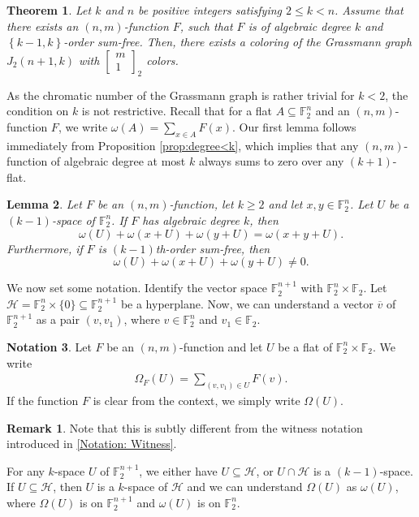 \documentclass[12pt]{article}
\newtheorem{thm}{Theorem}[section]
\newtheorem{lem}[thm]{Lemma}
\theoremstyle{definition}
\newtheorem{notation}[thm]{Notation}
\newtheorem*{remark}{Remark}
\newcommand{\HH}{\mathcal{H}}
\newcommand{\Gauss}[2]{{\begin{bmatrix} #1 \\ #2 \end{bmatrix}_2}}
\newcommand{\F}{\mathbb F}
\newcommand{\Fpnv}{\mathbb{F}_2^n}
\newcommand{\set}[1]{\left\{#1\right\}}
\newcounter{numb}
\begin{document}
\begin{thm} \label{T: k and k-1-order sum-free gives coloring}
    Let $k$ and $n$ be positive integers satisfying $2\leq k < n$. Assume that there exists an $(n,m)$-function $F$, such that $F$ is 
 of algebraic degree $k$
and $\set{k-1,k}$-order sum-free.
    Then, there exists a coloring of the Grassmann graph $J_2(n+1,k)$ with $\Gauss{m}{1}$ colors.
\end{thm}

As the chromatic number of the Grassmann graph is rather trivial for $k<2$, the condition on $k$ is not restrictive.
Recall that  for a flat $A\subseteq\Fpnv$ and an $(n,m)$-function $F$, we write $ \omega(A)=\sum_{x\in A} F(x)$. Our first lemma follows immediately from Proposition \ref{prop:degree<k}, which implies that any $(n, m)$-function of algebraic degree at most $k$ always sums to zero over any $(k+1)$-flat.

\begin{lem} \label{L: special condition} 
    Let $F$ be an $(n,m)$-function, let $k\geq 2$ and let $x, y \in \F_{2}^n$. Let $U$ be a $(k-1)$-space of $\F_2^n$. If $F$ has algebraic degree $k$, then $$\omega(U)+\omega(x+U)+\omega(y+U)=\omega(x+y+U).$$
    Furthermore, if $F$ is $(k-1)$th-order sum-free, then 
    $$
    \omega(U)+\omega(x+U)+\omega(y+U) \neq 0.
    $$
\end{lem}

We now set some notation. Identify the vector space $\F_2^{n+1}$ with $\F_2^n\times \F_2$. Let $\mathcal{H} = \F_2^n \times \{ 0\} \subseteq \F_2^{n+1}$ be a hyperplane. Now, we can understand a vector $\overline{v}$ of $\F_2^{n+1}$ as a pair $(v,v_1)$, where $v\in \F_2^n$ and $v_1\in \F_2$.



\begin{notation}
    Let $F$ be an $(n,m)$-function and let $U$ be a flat of $\F_2^n\times \F_2$. We write 
    \begin{align*}
        \Omega_F(U)=\sum\limits_{(v,v_1)\in U}^{}   F(v).
    \end{align*}
    If the function $F$ is clear from the context, we simply write $\Omega(U)$.
\end{notation}

\begin{remark}
    Note that this is subtly different from the witness notation introduced in \ref{Notation: Witness}.
\end{remark}


For any $k$-space $U$ of $\F_2^{n+1}$, we either have $U\subseteq \HH$, or $U\cap \HH$ is a $(k-1)$-space. 
If $U\subseteq \HH$, then $U$ is a $k$-space of $\HH$ and we can understand $\Omega(U)$ as $\omega(U)$, where $\Omega(U)$ is on $\F_2^{n+1}$ and $\omega(U)$ is on $\F_2^n$. 
\end{document}
